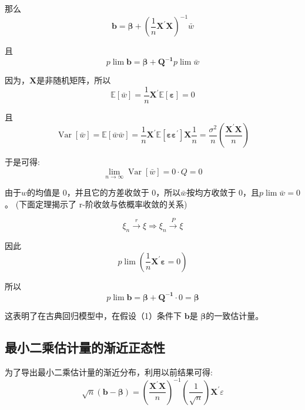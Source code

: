         那么 
        $$  \boldsymbol{b} =  \boldsymbol{\beta} +\left(\frac{1}{n}  \boldsymbol{X^{\prime} X} \right)^{-1} \bar{w} $$

        且
        $$ p \lim  \boldsymbol{b} =  \boldsymbol{\beta+Q^{-1}} p \lim \bar{w} $$

        因为，$  \boldsymbol{X} $是非随机矩阵，所以
        $$ \mathbb{E}[\bar{w}]=\frac{1}{n}  \boldsymbol{X^{\prime}} \mathbb{E} [  \boldsymbol{\varepsilon} ]=0 $$

        且
        $$ \operatorname{Var}[\bar{w}]=\mathbb{E} [\bar{w} \bar{w}]=\frac{1}{n}  \boldsymbol{X^{\prime}}
        \mathbb{E}\left[ \boldsymbol{\varepsilon \varepsilon^{\prime}} \right]  \boldsymbol{X}
             \frac{1}{n} = \frac{\sigma^{2}}{n}\left(\frac{  \boldsymbol{X^{\prime} X} }{n}\right) $$

        于是可得:
        $$ \lim_{n \rightarrow \infty} \operatorname{Var}[\bar{w}]=0 \cdot Q=0 $$

        由于$ w $的均值是 0，并且它的方差收敛于 0，所以$ \bar{w} $按均方收敛于 0，且$ p \lim \bar{w}=0 $。
        (下面定理揭示了 r-阶收敛与依概率收敛的关系)

        \begin{theorem}
            $$ \xi_{n} \stackrel{r}{\longrightarrow} \xi \Rightarrow \xi_{n} \stackrel{P}{\longrightarrow} \xi $$
        \end{theorem}

        因此 
        \begin{equation}
            p \lim \left(\frac{1}{n}  \boldsymbol{X^{\prime} \varepsilon} = 0\right)
        \end{equation}

        所以
        \begin{equation}
            p \lim  \boldsymbol{b} =  \boldsymbol{\beta + Q^{-1}} \cdot 0 =  \boldsymbol{\beta}
        \end{equation}

        这表明了在古典回归模型中，在假设（1）条件下 $  \boldsymbol{b} $是 $  \boldsymbol{\beta} $的一致估计量。

\subsection{最小二乘估计量的渐近正态性}

为了导出最小二乘估计量的渐近分布，利用以前结果可得:
$$ \sqrt{n}(  \boldsymbol{b-\beta} )=\left(\frac{  \boldsymbol{X^{\prime} X} }{n}\right)^{-1}
        \left(\frac{1}{\sqrt{n}}\right)  \boldsymbol{X^{\prime}} \varepsilon $$

